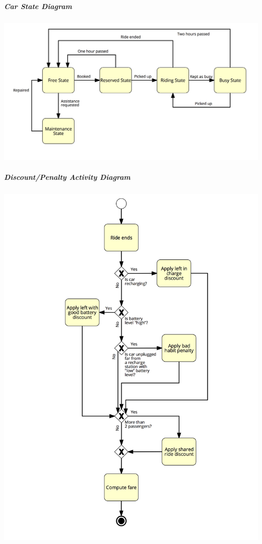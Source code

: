 \documentclass[]{article}
\let\oldsubparagraph\subparagraph
\renewcommand{\subparagraph}[1]{\oldsubparagraph{#1}\mbox{}}
\begin{document}
\newpage

\subparagraph{\texorpdfstring{Car State Diagram
\newline}{Car State Diagram }}\label{car-state-diagram}

\centerline{\includegraphics[width=6.25000in]{./FlowDiagrams/CarSD.png}}

\newpage

\subparagraph{\texorpdfstring{Discount/Penalty Activity Diagram
\newline}{Discount/Penalty Activity Diagram }}\label{discountpenalty-activity-diagram}

\centerline{\includegraphics[width=6.25000in]{./FlowDiagrams/DiscountPenaltyAD.png}}
\end{document}
